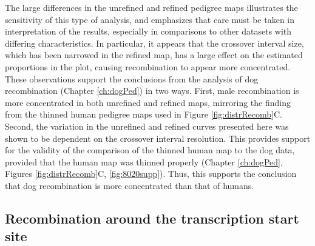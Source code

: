 
The large differences in the unrefined and refined pedigree maps illustrates the sensitivity of this type of analysis, and emphasizes that care must be taken in interpretation of the results, especially in comparisons to other datasets with differing characteristics.
In particular, it appears that the crossover interval size, which has been narrowed in the refined map, has a large effect on the estimated proportions in the plot, causing recombination to appear more concentrated.
These observations support the conclusions from the analysis of dog recombination (Chapter \ref{ch:dogPed}) in two ways.
First, male recombination is more concentrated in both unrefined and refined maps, mirroring the finding from the thinned human pedigree maps used in Figure \ref{fig:distrRecomb}C.
Second, the variation in the unrefined and refined curves presented here was shown to be dependent on the crossover interval resolution.
This provides support for the validity of the comparison of the thinned human map to the dog data, provided that the human map was thinned properly (Chapter \ref{ch:dogPed}, Figures \ref{fig:distrRecomb}C, \ref{fig:8020supp}).
Thus, this supports the conclusion that dog recombination is more concentrated than that of humans.


\subsection{Recombination around the transcription start site}

